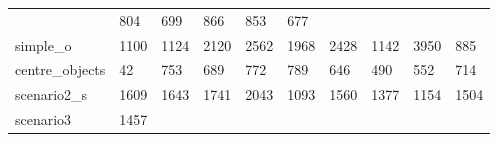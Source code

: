 \begin{table}[t]
\begin{center}
\begin{tabular}{llllllllll}
           & 804
        
           & 699
        
           & 866
        
           & 853
        
           & 677
         \\

        simple\_o
        
           & 1100
        
           & 1124
        
           & 2120
        
           & 2562
        
           & 1968
        
           & 2428
        
           & 1142
        
           & 3950
        
           & 885
         \\

        centre\_objects
        
           & 42
        
           & 753
        
           & 689
        
           & 772
        
           & 789
        
           & 646
        
           & 490
        
           & 552
        
           & 714
         \\

        scenario2\_s
        
           & 1609
        
           & 1643
        
           & 1741
        
           & 2043
        
           & 1093
        
           & 1560
        
           & 1377
        
           & 1154
        
           & 1504
         \\

        scenario3
        
           & 1457
        

\end{tabular}
\end{center}
\end{table}

